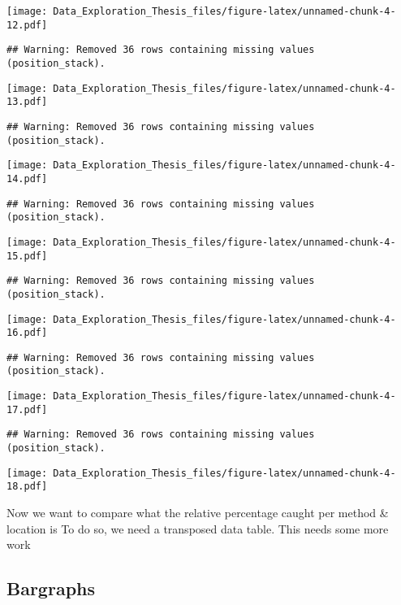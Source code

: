 \documentclass[]{article}
\begin{document}
\texttt{[image: Data\_Exploration\_Thesis\_files/figure-latex/unnamed-chunk-4-12.pdf]}

\begin{verbatim}
## Warning: Removed 36 rows containing missing values (position_stack).
\end{verbatim}

\texttt{[image: Data\_Exploration\_Thesis\_files/figure-latex/unnamed-chunk-4-13.pdf]}

\begin{verbatim}
## Warning: Removed 36 rows containing missing values (position_stack).
\end{verbatim}

\texttt{[image: Data\_Exploration\_Thesis\_files/figure-latex/unnamed-chunk-4-14.pdf]}

\begin{verbatim}
## Warning: Removed 36 rows containing missing values (position_stack).
\end{verbatim}

\texttt{[image: Data\_Exploration\_Thesis\_files/figure-latex/unnamed-chunk-4-15.pdf]}

\begin{verbatim}
## Warning: Removed 36 rows containing missing values (position_stack).
\end{verbatim}

\texttt{[image: Data\_Exploration\_Thesis\_files/figure-latex/unnamed-chunk-4-16.pdf]}

\begin{verbatim}
## Warning: Removed 36 rows containing missing values (position_stack).
\end{verbatim}

\texttt{[image: Data\_Exploration\_Thesis\_files/figure-latex/unnamed-chunk-4-17.pdf]}

\begin{verbatim}
## Warning: Removed 36 rows containing missing values (position_stack).
\end{verbatim}

\texttt{[image: Data\_Exploration\_Thesis\_files/figure-latex/unnamed-chunk-4-18.pdf]}

Now we want to compare what the relative percentage caught per method \&
location is To do so, we need a transposed data table. This needs some
more work

\subsection{Bargraphs}\label{bargraphs}
\end{document}
